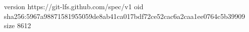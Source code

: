 version https://git-lfs.github.com/spec/v1
oid sha256:5967a98871581955059de8ab41ca017bdf72ce52cac6a2caa1ee0764c5b39909
size 8612

